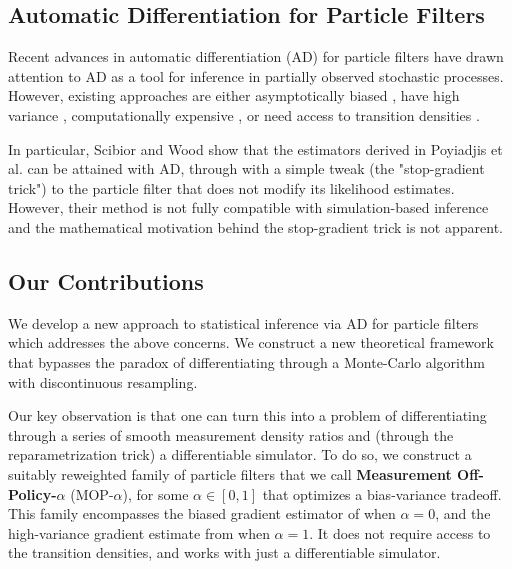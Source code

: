 \documentclass[9pt,twocolumn,twoside]{pnas-new}
\begin{document}
\subsection{Automatic Differentiation for Particle Filters}

Recent advances in automatic differentiation (AD) for particle filters \cite{blei2018vsmc, jon2018diffpf, corenflos21, scibior2021dpf, doucet2022particlebased} have drawn attention to AD as a tool for inference in partially observed stochastic processes. However, existing approaches are either asymptotically biased \cite{blei2018vsmc, jon2018diffpf}, have high variance \cite{poyiadjis11, scibior21}, computationally expensive \cite{corenflos21, chen24}, or need access to transition densities \cite{poyiadjis11, scibior21, doucet2022particlebased, chen24}.

In particular, Scibior and Wood \cite{scibior21} show that the estimators derived in Poyiadjis et al. \cite{poyiadjis11} can be attained with AD, through with a simple tweak (the "stop-gradient trick") to the particle filter that does not modify its likelihood estimates. However, their method is not fully compatible with simulation-based inference and the mathematical motivation behind the stop-gradient trick is not apparent. 



\subsection{Our Contributions}
We develop a new approach to statistical inference via AD for particle filters which addresses the above concerns. We construct a new theoretical framework that bypasses the paradox of differentiating through a Monte-Carlo algorithm with discontinuous resampling.

Our key observation is that one can turn this into a problem of differentiating through a series of smooth measurement density ratios and (through the reparametrization trick) a differentiable simulator. To do so, we construct a suitably reweighted family of particle filters that we call \textbf{Measurement Off-Policy-$\alpha$} (MOP-$\alpha$), for some $\alpha \in [0,1]$ that optimizes a bias-variance tradeoff. This family encompasses the biased gradient estimator of \cite{blei2018vsmc} when $\alpha=0$, and the high-variance gradient estimate from \cite{poyiadjis11, scibior21} when $\alpha=1$. It does not require access to the transition densities, and works with just a differentiable simulator.
\end{document}
